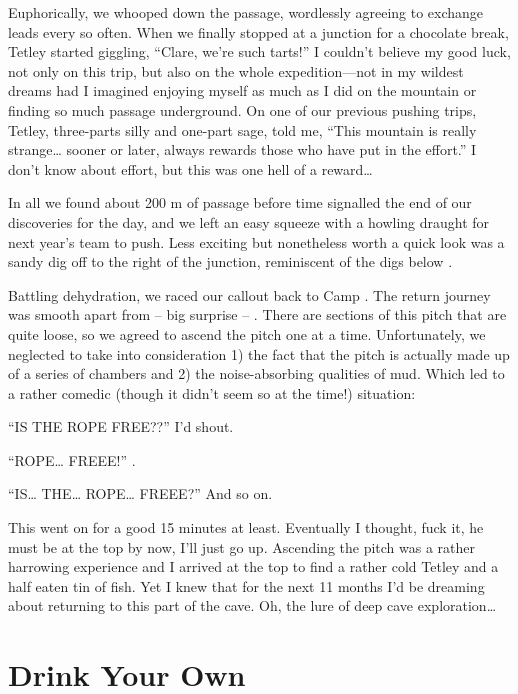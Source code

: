 Euphorically, we whooped down the passage, wordlessly agreeing to
exchange leads every so often. When we finally stopped at a junction for
a chocolate break, Tetley started giggling, ``Clare, we're such tarts!''
I couldn't believe my good luck, not only on this trip, but also on the
whole expedition---not in my wildest dreams had I imagined enjoying
myself as much as I did on the mountain or finding so much passage
underground. On one of our previous pushing trips, Tetley, three-parts
silly and one-part sage, told me, ``This mountain is really strange\ldots{} 
sooner or later,  always rewards those who have put in the effort.'' I don't know about effort, but this was one hell of a reward\ldots{}

In all we found about 200 m of passage before time signalled the end of
our discoveries for the day, and we left an easy squeeze with a howling
draught for next year's team to push. Less exciting but nonetheless
worth a quick look was a sandy dig off to the right of the junction,
reminiscent of the digs below .

Battling dehydration, we raced our callout back to Camp .
The return journey was smooth apart from -- big surprise -- . There are sections of this pitch that are quite loose, so we
agreed to ascend the pitch one at a time. Unfortunately, we neglected to
take into consideration 1) the fact that the pitch is actually made up
of a series of chambers and 2) the noise-absorbing qualities of mud.
Which led to a rather comedic (though it didn't seem so at the time!)
situation:

``IS THE ROPE FREE??'' I'd shout.

``ROPE\ldots{} FREEE!'' .

``IS\ldots{} THE\ldots{} ROPE\ldots{} FREEE?'' And so on.

This went on for a good 15 minutes at least. Eventually I thought, fuck
it, he must be at the top by now, I'll just go up. Ascending the pitch
was a rather harrowing experience and I arrived at the top to find a
rather cold Tetley and a half eaten tin of fish. Yet I knew that for the
next 11 months I'd be dreaming about returning to this part of the cave.
Oh, the lure of deep cave exploration\ldots{}




\section{Drink Your Own}

